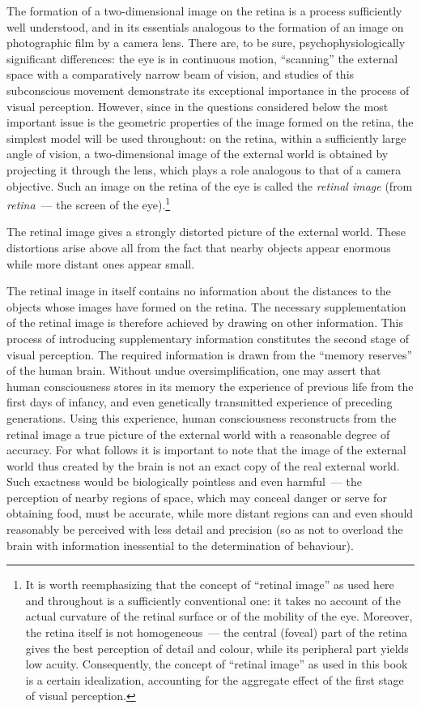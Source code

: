 The formation of a two-dimensional image on the retina is a process sufficiently well
understood, and in its essentials analogous to the formation of an image on
photographic film by a camera lens.  There are, to be sure, psychophysiologically
significant differences: the eye is in continuous motion, ``scanning'' the external space
with a comparatively narrow beam of vision, and studies of this subconscious movement
demonstrate its exceptional importance in the process of visual perception.  However,
since in the questions considered below the most important issue is the geometric
properties of the image formed on the retina, the simplest model will be used
throughout: on the retina, within a sufficiently large angle of vision, a two-dimensional
image of the external world is obtained by projecting it through the lens, which plays a
role analogous to that of a camera objective.  Such an image on the retina of the eye is
called the \emph{retinal image} (from \textit{retina}~--- the screen of the eye).\footnote{%
  It is worth reemphasizing that the concept of ``retinal image'' as used here and
  throughout is a sufficiently conventional one: it takes no account of the actual
  curvature of the retinal surface or of the mobility of the eye.  Moreover, the retina
  itself is not homogeneous~--- the central (foveal) part of the retina gives the best
  perception of detail and colour, while its peripheral part yields low acuity.
  Consequently, the concept of ``retinal image'' as used in this book is a certain
  idealization, accounting for the aggregate effect of the first stage of visual
  perception.}


The retinal image gives a strongly distorted picture of the external world.  These
distortions arise above all from the fact that nearby objects appear enormous while more
distant ones appear small.

The retinal image in itself contains no information about the distances to the objects
whose images have formed on the retina.  The necessary supplementation of the retinal
image is therefore achieved by drawing on other information.  This process of
introducing supplementary information constitutes the second stage of visual
perception.  The required information is drawn from the ``memory reserves'' of the
human brain.  Without undue oversimplification, one may assert that human
consciousness stores in its memory the experience of previous life from the first days of
infancy, and even genetically transmitted experience of preceding generations.  Using
this experience, human consciousness reconstructs from the retinal image a true picture
of the external world with a reasonable degree of accuracy.  For what follows it is
important to note that the image of the external world thus created by the brain is not an
exact copy of the real external world.  Such exactness would be biologically pointless
and even harmful~--- the perception of nearby regions of space, which may conceal
danger or serve for obtaining food, must be accurate, while more distant regions can and
even should reasonably be perceived with less detail and precision (so as not to overload
the brain with information inessential to the determination of behaviour).


